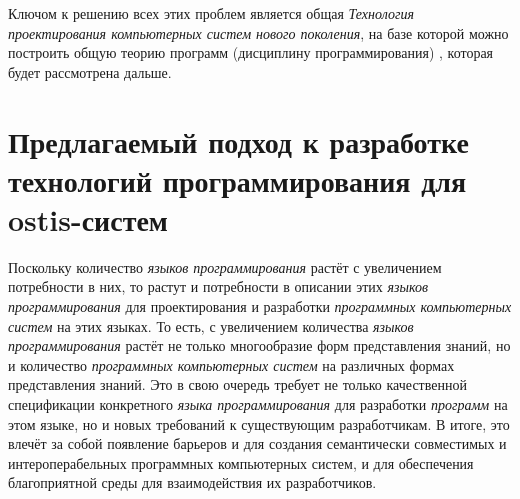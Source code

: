Ключом к решению всех этих проблем является общая \textit{Технология проектирования компьютерных систем нового поколения}, на базе которой можно построить общую теорию программ (дисциплину программирования) \cite{Deikstra1978}, которая будет рассмотрена дальше.

\section{Предлагаемый подход к разработке технологий программирования для ostis-систем}
\label{sec_programs_solution}

Поскольку количество \textit{языков программирования} растёт с увеличением потребности в них, то растут и потребности в описании этих \textit{языков программирования} для проектирования и разработки \textit{программных компьютерных систем} на этих языках. То есть, с увеличением количества \textit{языков программирования} растёт не только многообразие форм представления знаний, но и количество \textit{программных компьютерных систем} на различных формах представления знаний. Это в свою очередь требует не только качественной спецификации конкретного \textit{языка программирования} для разработки \textit{программ} на этом языке, но и новых требований к существующим разработчикам. В итоге, это влечёт за собой появление барьеров и для создания семантически совместимых и интероперабельных программных компьютерных систем, и для обеспечения благоприятной среды для взаимодействия их разработчиков.


